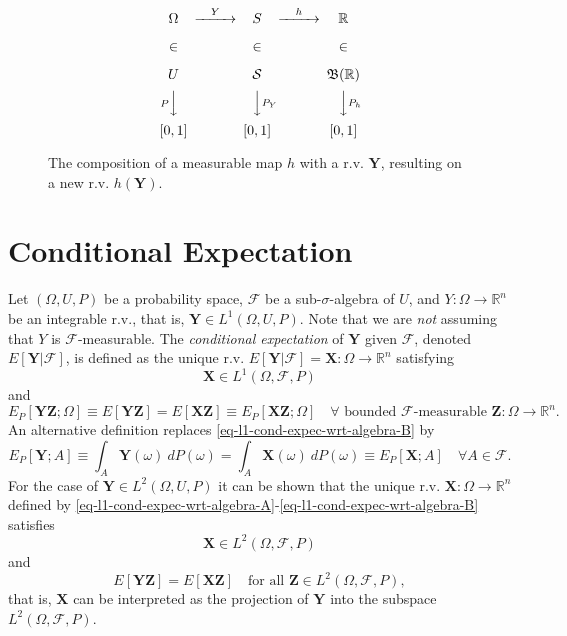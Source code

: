 \begin{figure}[h]
\[
\begin{CD}
\Omega   @>Y>> S           @>h>> \mathbb{R}              \\
\in      @.    \in         @.    \in                     \\
U        @.    \mathcal{S} @.    \mathfrak{B}(\mathbb{R})\\
@VP VV         @VVP_YV           @VVP_hV                 \\
[0,1]    @.    [0,1]       @.    [0,1]
\end{CD}
\]
\caption{The composition of a measurable map $h$ with a r.v. $\mathbf{Y}$,
resulting on a new r.v. $h(\mathbf{Y})$.
}
\label{fig-mcmc-hY-diagram}
\end{figure}

\section{Conditional Expectation}

Let $(\Omega,U,P)$ be a probability space,
$\mathcal{F}$ be a sub-$\sigma$-algebra of $U$,
and $Y:\Omega\rightarrow\mathbb{R}^n$ be an integrable r.v., that is, $\mathbf{Y}\in L^1(\Omega,U,P)$.
Note that we are {\it not} assuming that $Y$ is $\mathcal{F}$-measurable.
The {\it conditional expectation} of $\mathbf{Y}$ given $\mathcal{F}$,
denoted $E[\mathbf{Y}|\mathcal{F}]$,
is defined \cite{JaPr04} as the unique r.v. $E[\mathbf{Y}|\mathcal{F}]=\mathbf{X}:\Omega\rightarrow\mathbb{R}^n$ satisfying
\begin{equation}\label{eq-l1-cond-expec-wrt-algebra-A}
\mathbf{X}\in L^1(\Omega,\mathcal{F},P)
\end{equation}
and
\begin{equation}\label{eq-l1-cond-expec-wrt-algebra-B}
E_P[\mathbf{Y}\mathbf{Z};\Omega]\equiv E[\mathbf{Y}\mathbf{Z}] = E[\mathbf{X}\mathbf{Z}] \equiv E_P[\mathbf{X}\mathbf{Z};\Omega]
\quad
\forall\text{ bounded }\mathcal{F}\text{-measurable }\mathbf{Z}:\Omega\rightarrow\mathbb{R}^n.
\end{equation}
An alternative definition \cite{Du05} replaces \eqref{eq-l1-cond-expec-wrt-algebra-B} by
\begin{equation*}
E_P[\mathbf{Y};A]\equiv \int_A \mathbf{Y}(\omega)~dP(\omega) = \int_A \mathbf{X}(\omega)~dP(\omega)\equiv E_P[\mathbf{X};A] \quad\forall A\in\mathcal{F}.
\end{equation*}
For the case of $\mathbf{Y}\in L^2(\Omega,U,P)$ it can be shown \cite{JaPr04} that the
unique r.v. $\mathbf{X}:\Omega\rightarrow\mathbb{R}^n$ defined by \eqref{eq-l1-cond-expec-wrt-algebra-A}-\eqref{eq-l1-cond-expec-wrt-algebra-B} satisfies
\begin{equation}\label{eq-l2-cond-expec-wrt-algebra-A}
\mathbf{X}\in L^2(\Omega,\mathcal{F},P)
\end{equation}
and
\begin{equation}\label{eq-l2-cond-expec-wrt-algebra-B}
E[\mathbf{Y}\mathbf{Z}] = E[\mathbf{X}\mathbf{Z}]
\quad
\text{for all }\mathbf{Z}\in L^2(\Omega,\mathcal{F},P),
\end{equation}
that is, $\mathbf{X}$ can be interpreted as the projection of $\mathbf{Y}$ into the subspace $L^2(\Omega,\mathcal{F},P)$.


